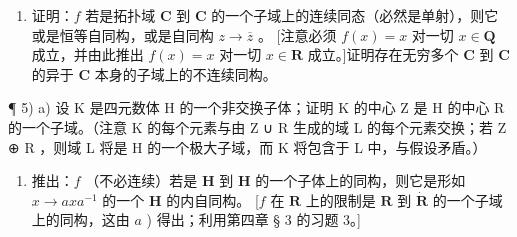 \begin{enumerate}
\def\labelenumi{\arabic{enumi})}
\setcounter{enumi}{3}
\tightlist
\item
  证明：\(f\) 若是拓扑域 \(\mathbf{C}\) 到 \(\mathbf{C}\) 的一个子域上的连续同态（必然是单射），则它或是恒等自同构，或是自同构 \(z \to \overline{z}\) 。 {[}注意必须 \(f(x) = x\) 对一切 \(x \in \mathbf{Q}\) 成立，并由此推出 \(f(x) = x\) 对一切 \(x \in \mathbf{R}\) 成立。{]}证明存在无穷多个 \(\mathbf{C}\) 到 \(\mathbf{C}\) 的异于 \(\mathbf{C}\) 本身的子域上的不连续同构。
\end{enumerate}

¶ 5) a) 设 K 是四元数体 H 的一个非交换子体；证明 K 的中心 Z 是 H 的中心 R 的一个子域。（注意 K 的每个元素与由 Z ∪ R 生成的域 L 的每个元素交换；若 Z ⊕ R ，则域 L 将是 H 的一个极大子域，而 K 将包含于 L 中，与假设矛盾。）

\begin{enumerate}
\def\labelenumi{\alph{enumi})}
\setcounter{enumi}{1}
\tightlist
\item
  推出：\(f\) （不必连续）若是 \(\mathbf{H}\) 到 \(\mathbf{H}\) 的一个子体上的同构，则它是形如 \(x \to axa^{-1}\) 的一个 \(\mathbf{H}\) 的内自同构。 {[}\(f\) 在 \(\mathbf{R}\) 上的限制是 \(\mathbf{R}\) 到 \(\dot{\mathbf{R}}\) 的一个子域上的同构，这由 \(a\) ) 得出；利用第四章 § 3 的习题 3。{]}
\end{enumerate}

